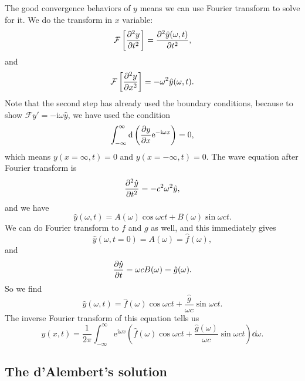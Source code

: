 \documentclass[hyperref, a4paper]{article}
\newcommand*{\ii}{\mathrm{i}}
\newcommand*{\ee}{\mathrm{e}}
\newcommand*{\fourier}{\mathcal{F}}
\newcommand*{\inftoinf}{\int_{-\infty}^{\infty}}
\begin{document}
The good convergence behaviors of $y$ means we can use Fourier transform 
to solve for it.
We do the transform in $x$ variable: 
\[
    \fourier \left[
        \pdv[2]{y}{t}
    \right] = \pdv[2]{\hat{y} (\omega, t)}{t},
\]
and 
\[
    \fourier \left[
        \pdv[2]{y}{x}
    \right] = - \omega^2 \hat{y}(\omega, t).
\]
Note that the second step has already used the boundary conditions, 
because to show $\fourier y' = - \ii \omega \hat{y}$, 
we have used the condition 
\[
    \inftoinf \dd \left(
        \pdv{y}{x} \ee^{- \ii \omega x}
    \right) = 0,
\]
which means $y(x = \infty, t) = 0$ and $y(x = -\infty, t) = 0$.
The wave equation after Fourier transform is 
\[
    \pdv[2]{\hat{y}}{t} = - c^2 \omega^2 \hat{y},
\]
and we have 
\[
    \hat{y}(\omega, t) = A(\omega) \cos \omega c t + B(\omega) \sin \omega c t.
\]
We can do Fourier transform to $f$ and $g$ as well, 
and this immediately gives 
\[
    \hat{y}(\omega, t = 0) = A(\omega) = \hat{f}(\omega),
\]
and 
\[
    \pdv{\hat{y}}{t}(\omega, t = 0) = \omega c B(\omega) = \hat{g}(\omega).
\]
So we find 
\[
    \hat{y}(\omega, t) = \hat{f}(\omega) \cos \omega c t + \frac{\hat{g}}{\omega c} \sin \omega c t.
\]
The inverse Fourier transform of this equation tells us 
\begin{equation}
    y(x, t) = \frac{1}{2\pi} \inftoinf \ee^{\ii \omega x} \left(
        \hat{f}(\omega) \cos \omega c t + \frac{\hat{g}(\omega)}{\omega c} \sin \omega c t
    \right) \dd{\omega}.
\end{equation}

\subsection{The d'Alembert's solution}
\end{document}
